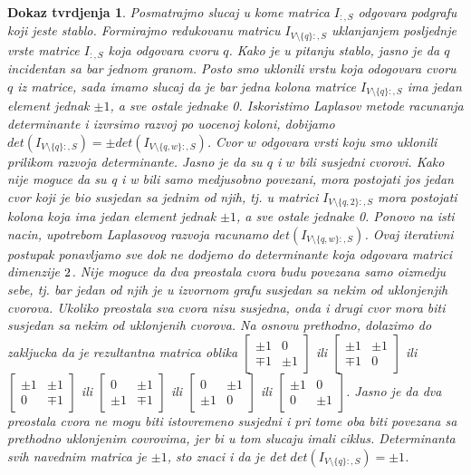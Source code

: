 \documentclass[11pt]{article}
\newtheorem*{custom_proof}{Dokaz tvrdjenja}
\begin{document}
\begin{custom_proof}
		Posmatrajmo slucaj u kome matrica $I_{:,S}$ odgovara podgrafu koji jeste stablo. Formirajmo redukovanu matricu $I_{V \setminus \{q\}:,S}$ uklanjanjem posljednje vrste matrice $I_{:,S}$ koja odgovara cvoru $q$. 
	        Kako je u pitanju stablo, jasno je da $q$ incidentan sa bar jednom granom. Posto smo uklonili vrstu koja odogovara cvoru $q$ iz matrice, sada imamo slucaj da je bar jedna kolona matrice $I_{V \setminus \{q\}:,S}$
		ima jedan element jednak $\pm 1$, a sve ostale jednake 0. Iskoristimo Laplasov metode racunanja determinante i izvrsimo razvoj po uocenoj koloni, 
		dobijamo $det(I_{V \setminus \{q\}:,S}) = \pm det(I_{V \setminus \{q,w\}:,S})$. Cvor $w$ odgovara vrsti koju smo uklonili prilikom razvoja determinante. Jasno je da su $q$ i $w$ bili susjedni cvorovi. 
		Kako nije moguce da su q i w bili samo medjusobno povezani, mora postojati jos jedan cvor koji je bio susjedan sa jednim od njih, tj. u matrici $I_{V \setminus \{q,2\}:,S}$ mora postojati kolona koja ima jedan element
		jednak $\pm 1$, a sve ostale jednake 0. Ponovo na isti nacin, upotrebom Laplasovog razvoja racunamo $det(I_{V \setminus \{q,w\}:,S})$. 
		Ovaj iterativni postupak ponavljamo sve dok ne dodjemo do determinante koja odgovara matrici dimenzije $2 \time 2$. Nije moguce da dva preostala cvora budu povezana samo oizmedju sebe, tj. bar jedan od njih 
		je u izvornom grafu susjedan sa nekim od uklonjenjih cvorova. Ukoliko preostala sva cvora nisu susjedna, onda i drugi cvor mora biti susjedan sa nekim od uklonjenih cvorova. Na osnovu prethodno, dolazimo do 				zakljucka da je rezultantna matrica oblika $\begin{bmatrix} \pm 1 &  0 \\ \mp 1 & \pm 1 \end{bmatrix}$ ili $\begin{bmatrix} \pm 1 &  \pm 1 \\ \mp 1 & 0 \end{bmatrix}$ ili $\begin{bmatrix} \pm 1 &  \pm 1 \\ 0 &  \mp 1 		\end{bmatrix}$ ili $\begin{bmatrix} 0 & \pm 1 \\ \pm 1 & \mp 1 \end{bmatrix}$ ili $\begin{bmatrix} 0 &  \pm 1 \\ \pm 1 & 0 \end{bmatrix}$ ili $\begin{bmatrix} \pm 1 &  0 \\ 0 & \pm 1 \end{bmatrix}$. 
		Jasno je da dva preostala cvora ne mogu biti istovremeno susjedni i pri tome oba biti povezana sa prethodno uklonjenim covrovima, jer bi u tom slucaju imali ciklus. Determinanta svih navednim matrica je $\pm 1$, 
		sto znaci i da je det $det(I_{V \setminus \{q\}:,S}) = \pm 1$.
	

\end{custom_proof}
\end{document}
